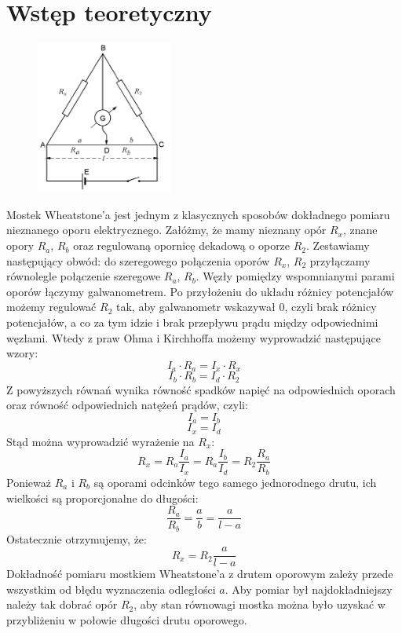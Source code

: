 \documentclass[a4paper,11pt]{article}
\begin{document}
\section{Wstęp teoretyczny}
\begin{figure}
\vspace*{-0.5cm}
\includegraphics[width=0.4\textwidth]{./schemat}
\end{figure}
Mostek Wheatstone’a jest jednym z klasycznych sposobów dokładnego pomiaru nieznanego oporu elektrycznego. Załóżmy, że mamy nieznany opór $R_x$, znane opory $R_a$, $R_b$ oraz regulowaną opornicę dekadową o oporze $R_2$. Zestawiamy następujący obwód: do szeregowego połączenia oporów $R_x$, $R_2$ przyłączamy równolegle połączenie szeregowe $R_a$, $R_b$. Węzły pomiędzy wspomnianymi parami oporów łączymy galwanometrem. Po przyłożeniu do układu różnicy potencjałów możemy regulować $R_2$ tak, aby galwanometr wskazywał 0, czyli brak różnicy potencjałów, a co za tym idzie i brak przepływu prądu między odpowiednimi węzłami. Wtedy z praw Ohma i Kirchhoffa możemy wyprowadzić następujące wzory: 
$$I_a\cdot R_a=I_x\cdot R_x$$
$$I_b\cdot R_b=I_d\cdot R_2$$
Z powyższych równań wynika równość spadków napięć na odpowiednich oporach oraz równość odpowiednich natężeń prądów, czyli:
$$I_a=I_b$$
$$I_x=I_d$$
Stąd można wyprowadzić wyrażenie na $R_x$:
$$R_x=R_a\frac{I_a}{I_x}=R_a\frac{I_b}{I_d}=R_2\frac{R_a}{R_b}$$
Ponieważ $R_a$ i $R_b$ są oporami odcinków tego samego jednorodnego drutu, ich wielkości są proporcjonalne do długości:
$$\frac{R_a}{R_b}=\dfrac{a}{b}=\dfrac{a}{l-a}$$
Ostatecznie otrzymujemy, że:
$$R_x=R_2\dfrac{a}{l-a}$$
Dokładność pomiaru mostkiem Wheatstone’a z drutem oporowym zależy przede wszystkim od błędu wyznaczenia odległości $a$. Aby pomiar był najdokładniejszy należy tak dobrać opór $R_2$, aby stan równowagi mostka można było uzyskać w przybliżeniu w połowie długości drutu oporowego.
\end{document}
